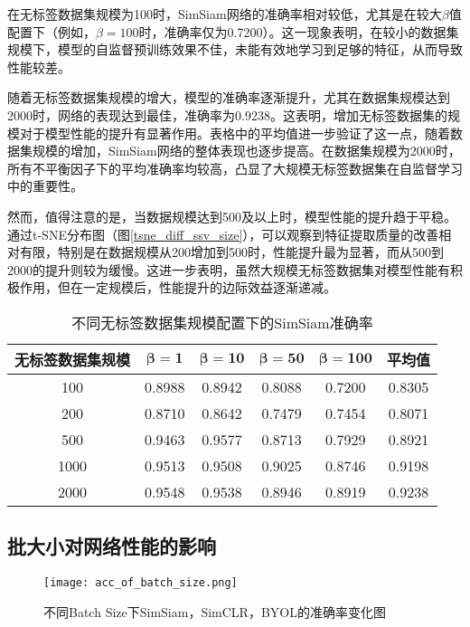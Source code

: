 \documentclass[master]{thesis-uestc}
\begin{document}
在无标签数据集规模为100时，SimSiam网络的准确率相对较低，尤其是在较大$\beta$值配置下（例如，$\beta=100$时，准确率仅为0.7200）。这一现象表明，在较小的数据集规模下，模型的自监督预训练效果不佳，未能有效地学习到足够的特征，从而导致性能较差。

随着无标签数据集规模的增大，模型的准确率逐渐提升，尤其在数据集规模达到2000时，网络的表现达到最佳，准确率为0.9238。这表明，增加无标签数据集的规模对于模型性能的提升有显著作用。表格中的平均值进一步验证了这一点，随着数据集规模的增加，SimSiam网络的整体表现也逐步提高。在数据集规模为2000时，所有不平衡因子下的平均准确率均较高，凸显了大规模无标签数据集在自监督学习中的重要性。

然而，值得注意的是，当数据规模达到500及以上时，模型性能的提升趋于平稳。通过t-SNE分布图（图\ref{tsne_diff_ssv_size}），可以观察到特征提取质量的改善相对有限，特别是在数据规模从200增加到500时，性能提升最为显著，而从500到2000的提升则较为缓慢。这进一步表明，虽然大规模无标签数据集对模型性能有积极作用，但在一定规模后，性能提升的边际效益逐渐递减。

\begin{table}[h]
    \centering
    \caption{不同无标签数据集规模配置下的SimSiam准确率}
    \begin{tabular}{cccccc}
    \toprule
    无标签数据集规模 & $\boldsymbol{\beta=1}$ & $\boldsymbol{\beta=10}$ & $\boldsymbol{\beta=50}$ & $\boldsymbol{\beta=100}$ & \textbf{平均值} \\
    \midrule
    100   & 0.8988 & 0.8942 & 0.8088 & 0.7200 & 0.8305 \\
    200   & 0.8710 & 0.8642 & 0.7479 & 0.7454 & 0.8071 \\
    500   & 0.9463 & 0.9577 & 0.8713 & 0.7929 & 0.8921 \\
    1000  & 0.9513 & 0.9508 & 0.9025 & 0.8746 & 0.9198 \\
    2000  & 0.9548 & 0.9538 & 0.8946 & 0.8919 & 0.9238 \\
    \bottomrule
    \end{tabular}
    \label{tab:fine_tune_acc_ssv_size}
\end{table}



\subsection{批大小对网络性能的影响}

\begin{figure}[h]
    \centering
    \texttt{[image: acc\_of\_batch\_size.png]}
    \caption{不同Batch Size下SimSiam，SimCLR，BYOL的准确率变化图}
    \label{acc_of_batch_size}
\end{figure}
\end{document}
